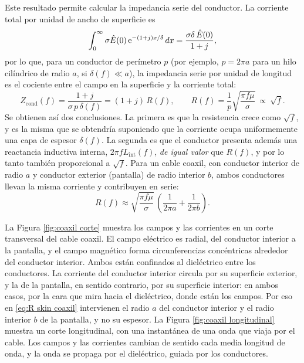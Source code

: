 Este resultado permite calcular la impedancia serie del conductor. La corriente total por unidad de ancho de superficie es
\begin{equation*}
    \int_0^\infty \sigma \hat E(0)\,\mathrm{e}^{-(1+j)x/\delta}\,dx = \frac{\sigma\delta\,\hat E(0)}{1+j},
\end{equation*}
por lo que, para un conductor de perímetro $p$ (por ejemplo, $p=2\pi a$ para un hilo cilíndrico de radio $a$, si $\delta(f)\ll a$), la impedancia serie por unidad de longitud es el cociente entre el campo en la superficie y la corriente total:
\begin{equation}\label{eq:Z skin}
    Z_{\text{cond}}(f) = \frac{1+j}{\sigma\, p\, \delta(f)} = (1+j)\,R(f), \qquad R(f) = \frac{1}{p}\sqrt{\frac{\pi f \mu}{\sigma}} \ \propto\ \sqrt{f}.
\end{equation}
Se obtienen así dos conclusiones. La primera es que la resistencia crece como $\sqrt f$, y es la misma que se obtendría suponiendo que la corriente ocupa uniformemente una capa de espesor $\delta(f)$. La segunda es que el conductor presenta además una reactancia inductiva interna, $2\pi f L_{\text{int}}(f)$, \emph{de igual valor} que $R(f)$, y por lo tanto también proporcional a $\sqrt f$. Para un cable coaxil, con conductor interior de radio $a$ y conductor exterior (pantalla) de radio interior $b$, ambos conductores llevan la misma corriente y contribuyen en serie:
\begin{equation}\label{eq:R skin coaxil}
    R(f) \approx \sqrt{\frac{\pi f \mu}{\sigma}}\, \left(\frac{1}{2\pi a} + \frac{1}{2\pi b}\right).
\end{equation}

La Figura \ref{fig:coaxil corte} muestra los campos y las corrientes en un corte transversal del cable coaxil. El campo eléctrico es radial, del conductor interior a la pantalla, y el campo magnético forma circunferencias concéntricas alrededor del conductor interior. Ambos están confinados al dieléctrico entre los conductores. La corriente del conductor interior circula por su superficie exterior, y la de la pantalla, en sentido contrario, por su superficie interior: en ambos casos, por la cara que mira hacia el dieléctrico, donde están los campos. Por eso en \eqref{eq:R skin coaxil} intervienen el radio $a$ del conductor interior y el radio interior $b$ de la pantalla, y no su espesor. La Figura \ref{fig:coaxil longitudinal} muestra un corte longitudinal, con una instantánea de una onda que viaja por el cable. Los campos y las corrientes cambian de sentido cada media longitud de onda, y la onda se propaga por el dieléctrico, guiada por los conductores.

